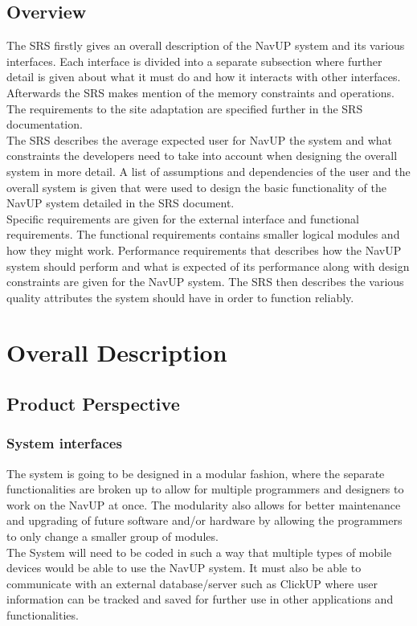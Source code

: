 \documentclass[a4paper,12pt]{article}
\begin{document}
\subsection{Overview}
The SRS firstly gives an overall description of the NavUP system and its various interfaces. Each interface is divided into a separate subsection where further detail is given about what it must do and how it interacts with other interfaces. Afterwards the SRS makes mention of the memory constraints and operations. The requirements to the site adaptation are specified further in the SRS documentation.\\
The SRS describes the average expected user for NavUP the system and what constraints the developers need to take into account when designing the overall system in more detail. A list of assumptions and dependencies of the user and the overall system is given that were used to design the basic functionality of the NavUP system detailed in the SRS document.\\
Specific requirements are given for the external interface and functional requirements. The functional requirements contains smaller logical modules and how they might work. Performance requirements that describes how the NavUP system should perform and what is expected of its performance along with design constraints are given for the NavUP system. The SRS then describes the various quality attributes the system should have in order to function reliably.\\ 
\section{Overall Description}
\subsection{Product Perspective}
\subsubsection{System interfaces}
The system is going to be designed in a modular fashion, where the separate functionalities are broken up to allow for multiple programmers and designers to work on the NavUP at once. The modularity also allows for better maintenance and upgrading of future software and/or hardware by allowing the programmers to only change a smaller group of modules.\\
The System will need to be coded in such a way that multiple types of mobile devices would be able to use the NavUP system. It must also be able to communicate with an external database/server such as ClickUP where user information can be tracked and saved for further use in other applications and functionalities.\\
\end{document}
